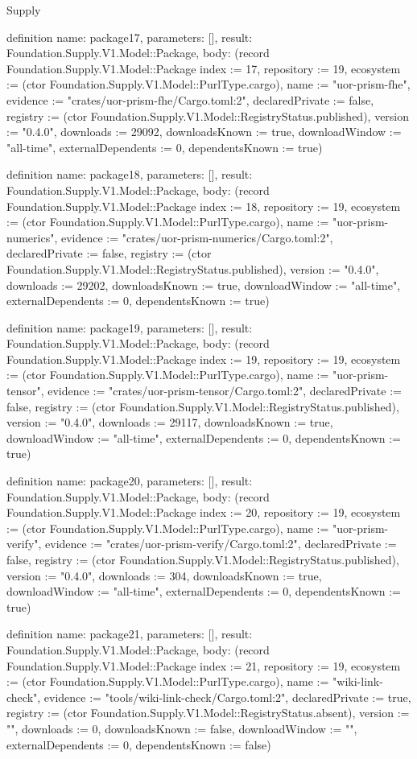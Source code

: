 \begin{lexlean}{Supply}
\begin{semanticmodule}
definition{
  name: package17,
  parameters: [],
  result: Foundation.Supply.V1.Model::Package,
  body: (record Foundation.Supply.V1.Model::Package {index := 17, repository := 19, ecosystem := (ctor Foundation.Supply.V1.Model::PurlType.cargo), name := "uor-prism-fhe", evidence := "crates/uor-prism-fhe/Cargo.toml:2", declaredPrivate := false, registry := (ctor Foundation.Supply.V1.Model::RegistryStatus.published), version := "0.4.0", downloads := 29092, downloadsKnown := true, downloadWindow := "all-time", externalDependents := 0, dependentsKnown := true})
}

definition{
  name: package18,
  parameters: [],
  result: Foundation.Supply.V1.Model::Package,
  body: (record Foundation.Supply.V1.Model::Package {index := 18, repository := 19, ecosystem := (ctor Foundation.Supply.V1.Model::PurlType.cargo), name := "uor-prism-numerics", evidence := "crates/uor-prism-numerics/Cargo.toml:2", declaredPrivate := false, registry := (ctor Foundation.Supply.V1.Model::RegistryStatus.published), version := "0.4.0", downloads := 29202, downloadsKnown := true, downloadWindow := "all-time", externalDependents := 0, dependentsKnown := true})
}

definition{
  name: package19,
  parameters: [],
  result: Foundation.Supply.V1.Model::Package,
  body: (record Foundation.Supply.V1.Model::Package {index := 19, repository := 19, ecosystem := (ctor Foundation.Supply.V1.Model::PurlType.cargo), name := "uor-prism-tensor", evidence := "crates/uor-prism-tensor/Cargo.toml:2", declaredPrivate := false, registry := (ctor Foundation.Supply.V1.Model::RegistryStatus.published), version := "0.4.0", downloads := 29117, downloadsKnown := true, downloadWindow := "all-time", externalDependents := 0, dependentsKnown := true})
}

definition{
  name: package20,
  parameters: [],
  result: Foundation.Supply.V1.Model::Package,
  body: (record Foundation.Supply.V1.Model::Package {index := 20, repository := 19, ecosystem := (ctor Foundation.Supply.V1.Model::PurlType.cargo), name := "uor-prism-verify", evidence := "crates/uor-prism-verify/Cargo.toml:2", declaredPrivate := false, registry := (ctor Foundation.Supply.V1.Model::RegistryStatus.published), version := "0.4.0", downloads := 304, downloadsKnown := true, downloadWindow := "all-time", externalDependents := 0, dependentsKnown := true})
}

definition{
  name: package21,
  parameters: [],
  result: Foundation.Supply.V1.Model::Package,
  body: (record Foundation.Supply.V1.Model::Package {index := 21, repository := 19, ecosystem := (ctor Foundation.Supply.V1.Model::PurlType.cargo), name := "wiki-link-check", evidence := "tools/wiki-link-check/Cargo.toml:2", declaredPrivate := true, registry := (ctor Foundation.Supply.V1.Model::RegistryStatus.absent), version := "", downloads := 0, downloadsKnown := false, downloadWindow := "", externalDependents := 0, dependentsKnown := false})
}


\end{semanticmodule}
\end{lexlean}
